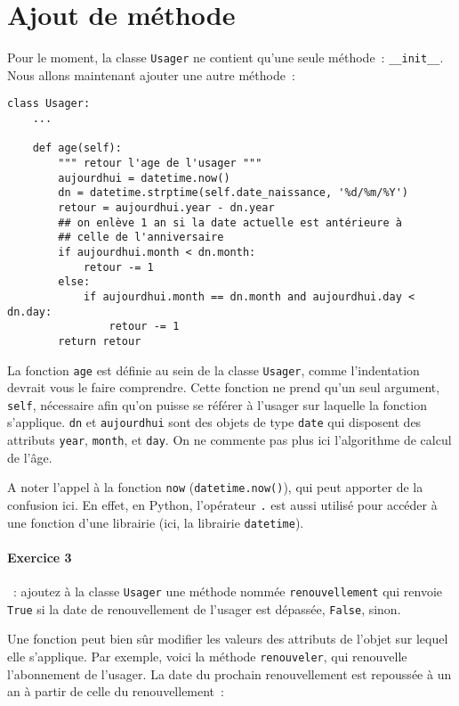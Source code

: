 \documentclass{article}
\begin{document}
\section{Ajout de méthode}

Pour le moment, la classe \texttt{Usager} ne contient qu'une seule méthode~: \texttt{\_\_init\_\_}. Nous allons maintenant ajouter une autre méthode~:

\begin{verbatim}
class Usager:
    ...
    
    def age(self):
        """ retour l'age de l'usager """
        aujourdhui = datetime.now()
        dn = datetime.strptime(self.date_naissance, '%d/%m/%Y')
        retour = aujourdhui.year - dn.year
        ## on enlève 1 an si la date actuelle est antérieure à
        ## celle de l'anniversaire
        if aujourdhui.month < dn.month:
            retour -= 1
        else:
            if aujourdhui.month == dn.month and aujourdhui.day < dn.day:
                retour -= 1
        return retour
\end{verbatim}

La fonction \texttt{age} est définie au sein de la classe \texttt{Usager}, comme l'indentation devrait vous le faire comprendre. Cette fonction ne prend qu'un seul argument, \texttt{self}, nécessaire afin qu'on puisse se référer à l'usager sur laquelle la fonction s'applique. \texttt{dn} et \texttt{aujourdhui} sont des objets de type \texttt{date} qui disposent des attributs \texttt{year}, \texttt{month}, et \texttt{day}. On ne commente pas plus ici l'algorithme de calcul de l'âge. 

A noter l'appel à la fonction \texttt{now} (\texttt{datetime.now()}), qui peut apporter de la confusion ici. En effet, en Python, l'opérateur \texttt{.} est aussi utilisé pour accéder à une fonction d'une librairie (ici, la librairie \texttt{datetime}).


\paragraph{Exercice 3}~: ajoutez à la classe \texttt{Usager} une méthode nommée \texttt{renouvellement} qui renvoie \texttt{True} si la date de renouvellement de l'usager est dépassée, \texttt{False}, sinon.

Une fonction peut bien sûr modifier les valeurs des attributs de l'objet sur lequel elle s'applique. Par exemple, voici la méthode \texttt{renouveler}, qui renouvelle l'abonnement de l'usager. La date du prochain renouvellement est repoussée à un an à partir de celle du renouvellement~: 
\end{document}
